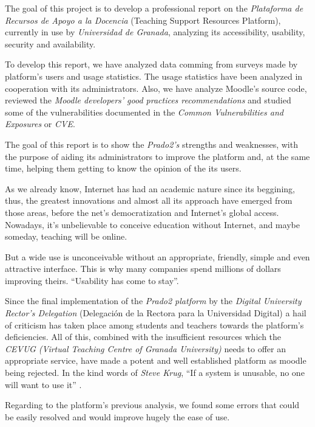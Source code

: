 {{The goal of this project is to develop a professional report on the \textit{Plataforma de Recursos de Apoyo a la Docencia} (Teaching Support Resources Platform), currently in use by \textit{Universidad de Granada}, analyzing its accessibility, usability, security and availability.

\bigskip
To develop this report, we have analyzed data comming from surveys made by platform's users and usage statistics. The usage statistics have been analyzed in cooperation with its administrators. Also, we have analyze Moodle's source code, reviewed the \textit{Moodle developers' good practices recommendations} and studied some of the vulnerabilities documented in the \textit{Common Vulnerabilities and Exposures} or \textit{CVE}.

\bigskip
The goal of this report is to show the \textit{Prado2's} strengths and weaknesses, with the purpose of aiding its administrators to improve the platform and, at the same time, helping them getting to know the opinion of the its users.

\bigskip
As we already know, Internet has had an academic nature since its beggining, thus, the greatest innovations and almost all its approach have emerged from those areas, before the net’s democratization and Internet’s global access. Nowadays, it’s unbelievable to conceive education without Internet, and maybe someday, teaching will be online.

\bigskip
But a wide use is unconceivable without an appropriate, friendly, simple and even attractive interface. This is why many companies spend millions of dollars improving theirs. ``Usability has come to stay''.\cite{jakonielsen} 

\bigskip
Since the final implementation of the \textit{Prado2 platform} by the \textit{Digital University Rector’s Delegation} (Delegación de la Rectora para la Universidad Digital) a hail of criticism has taken place among students and teachers towards the platform’s deficiencies. All of this, combined with the insufficient resources which the \textit{CEVUG (Virtual Teaching Centre of Granada University)} needs to offer an appropriate service, have made a potent and well established platform as moodle being rejected. In the kind words of \textit{Steve Krug}, ``If a system is unusable, no one will want to use it'' \cite{stevekrug}.

\bigskip
Regarding to the platform's previous analysis, we found some errors that could be easily resolved and would improve hugely the ease of use.

}}
